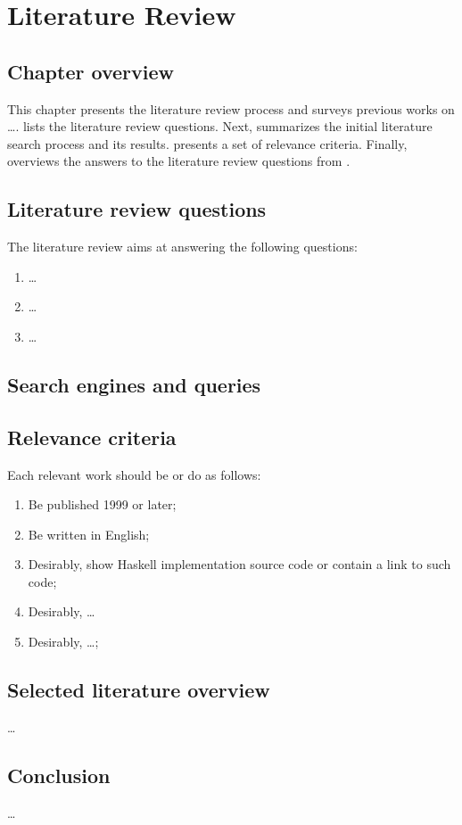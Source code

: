 \chapter{Literature Review}
\label{chap:LiteratureReview}

\section{Chapter overview}

This chapter presents the literature review process and surveys previous works on \dots.
 lists the literature review questions.
Next,  summarizes the initial literature search process and its results.
 presents a set of relevance criteria.
Finally,  overviews the answers to the literature review questions from .

\section{Literature review questions}
\label{sec:researchQuestions}

The literature review aims at answering the following questions:

\begin{enumerate}[noitemsep]
    \item \dots
    \item \dots
    \item \dots
\end{enumerate}

\section{Search engines and queries}
\label{sec:searchProcess}

\section{Relevance criteria} \label {sec:relevance}

Each relevant work should be or do as follows:

\begin{enumerate}[noitemsep, label=\arabic*) ]
    \item Be published 1999 or later;
    \item Be written in English;
    \item Desirably, show Haskell implementation source code or contain a link to such code;
    \item Desirably, \dots
    \item Desirably, \dots;
\end{enumerate}

\section{Selected literature overview} \label{sec:selectedLiterature}

\dots

\section{Conclusion}

\dots